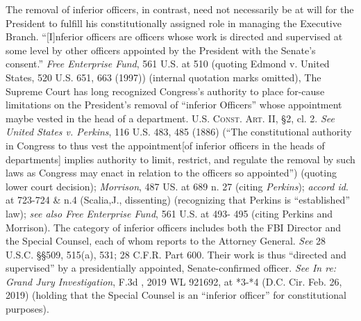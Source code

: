 The removal of inferior officers, in contrast, need not necessarily be at will for the President to fulfill his constitutionally assigned role in managing the Executive Branch.
“[I]nferior officers are officers whose work is directed and supervised at some level by other officers appointed by the President with the Senate’s consent.”
\textit{Free Enterprise Fund}, 561 U.S. at 510 (quoting Edmond v. United States, 520 U.S. 651, 663 (1997)) (internal quotation marks omitted), The Supreme Court has long recognized Congress’s authority to place for-cause limitations on the President’s removal of “inferior Officers” whose appointment maybe vested in the head of a department.
\textsc{U.S. Const. Art. II}, \S 2, cl. 2.
\textit{See United States v. Perkins}, 116 U.S. 483, 485 (1886) (“The constitutional authority in Congress to thus vest the appointment[of inferior officers in the heads of departments] implies authority to limit, restrict, and regulate the removal by such laws as Congress may enact in relation to the officers so appointed”) (quoting lower court decision);
\textit{Morrison}, 487 US. at 689 n. 27 (citing \textit{Perkins});
\textit{accord id}. at 723-724 \& n.4 (Scalia,J., dissenting) (recognizing that Perkins is “established” law);
\textit{see also Free Enterprise Fund}, 561 U.S. at 493- 495 (citing Perkins and Morrison).
The category of inferior officers includes both the FBI Director and the Special Counsel, each of whom reports to the Attorney General.
\textit{See} 28 U.S.C. \S\S 509, 515(a), 531; 28 C.F.R. Part 600.
Their work is thus “directed and supervised” by a presidentially appointed, Senate-confirmed officer.
\textit{See In re: Grand Jury Investigation}, \textunderscore\textunderscore F.3d \textunderscore\textunderscore, 2019 WL 921692, at *3-*4 (D.C. Cir. Feb. 26, 2019) (holding that the Special Counsel is an “inferior officer” for constitutional purposes).

